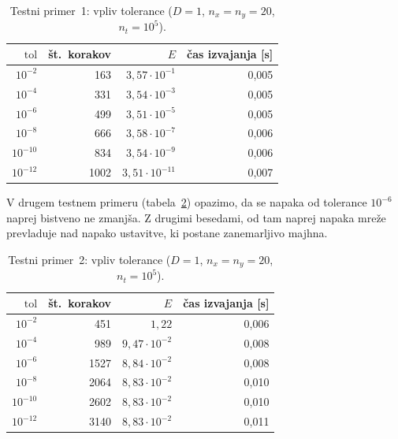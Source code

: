 \documentclass[a4paper,11pt]{article}
\begin{document}
	\begin{table}[htbp]
		\centering
		\begin{tabular}{rrrr}
			\toprule
			$\text{tol}$ & št.\ korakov & $E$                     & čas izvajanja [s] \\
			\midrule
			$10^{-2}$    & 163          & $3{,}57 \cdot 10^{-1}$  & 0{,}005           \\
			$10^{-4}$    & 331          & $3{,}54 \cdot 10^{-3}$  & 0{,}005           \\
			$10^{-6}$    & 499          & $3{,}51 \cdot 10^{-5}$  & 0{,}005           \\
			$10^{-8}$    & 666          & $3{,}58 \cdot 10^{-7}$  & 0{,}006           \\
			$10^{-10}$   & 834          & $3{,}54 \cdot 10^{-9}$  & 0{,}006           \\
			$10^{-12}$   & 1002         & $3{,}51 \cdot 10^{-11}$ & 0{,}007           \\
			\bottomrule
		\end{tabular}
		\caption{Testni primer~1: vpliv tolerance ($D = 1$, $n_x = n_y = 20$, $n_t = 10^5$).}
		\label{tab:tol1}
	\end{table}
	
	V drugem testnem primeru (tabela~\ref{tab:tol2}) opazimo, da se napaka od tolerance $10^{-6}$ naprej bistveno ne zmanjša. Z drugimi besedami, od tam naprej napaka mreže prevladuje nad napako ustavitve, ki postane zanemarljivo majhna.
	
	\begin{table}[htbp]
		\centering
		\begin{tabular}{rrrr}
			\toprule
			$\text{tol}$ & št.\ korakov & $E$                     & čas izvajanja [s] \\
			\midrule
			$10^{-2}$    & 451          & $1{,}22$                & 0{,}006           \\
			$10^{-4}$    & 989          & $9{,}47 \cdot 10^{-2}$  & 0{,}008           \\
			$10^{-6}$    & 1527         & $8{,}84 \cdot 10^{-2}$  & 0{,}008           \\
			$10^{-8}$    & 2064         & $8{,}83 \cdot 10^{-2}$  & 0{,}010           \\
			$10^{-10}$   & 2602         & $8{,}83 \cdot 10^{-2}$  & 0{,}010           \\
			$10^{-12}$   & 3140         & $8{,}83 \cdot 10^{-2}$  & 0{,}011           \\
			\bottomrule
		\end{tabular}
		\caption{Testni primer~2: vpliv tolerance ($D = 1$, $n_x = n_y = 20$, $n_t = 10^5$).}
		\label{tab:tol2}
	\end{table}
	
\end{document}
